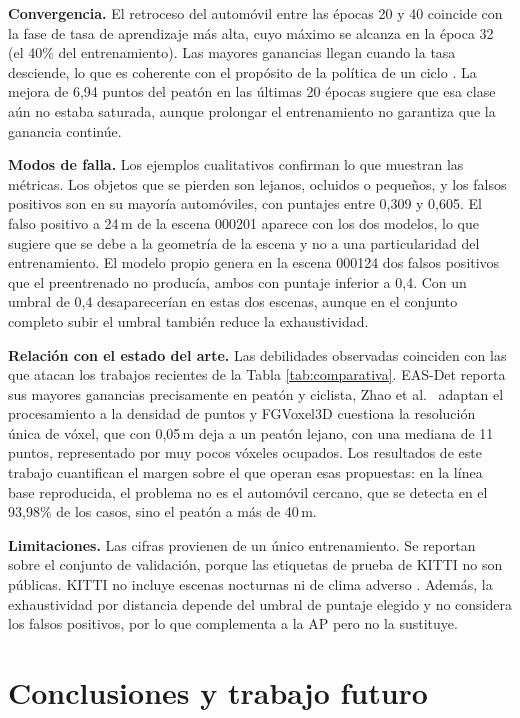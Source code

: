 \documentclass[11pt,letterpaper]{article}
\begin{document}
\textbf{Convergencia.} El retroceso del automóvil entre las épocas 20 y 40 coincide con la fase de tasa de aprendizaje más alta, cuyo máximo se alcanza en la época 32 (el 40\% del entrenamiento). Las mayores ganancias llegan cuando la tasa desciende, lo que es coherente con el propósito de la política de un ciclo \cite{smith2017}. La mejora de 6,94 puntos del peatón en las últimas 20 épocas sugiere que esa clase aún no estaba saturada, aunque prolongar el entrenamiento no garantiza que la ganancia continúe.

\textbf{Modos de falla.} Los ejemplos cualitativos confirman lo que muestran las métricas. Los objetos que se pierden son lejanos, ocluidos o pequeños, y los falsos positivos son en su mayoría automóviles, con puntajes entre 0,309 y 0,605. El falso positivo a 24\,m de la escena 000201 aparece con los dos modelos, lo que sugiere que se debe a la geometría de la escena y no a una particularidad del entrenamiento. El modelo propio genera en la escena 000124 dos falsos positivos que el preentrenado no producía, ambos con puntaje inferior a 0,4. Con un umbral de 0,4 desaparecerían en estas dos escenas, aunque en el conjunto completo subir el umbral también reduce la exhaustividad.

\textbf{Relación con el estado del arte.} Las debilidades observadas coinciden con las que atacan los trabajos recientes de la Tabla \ref{tab:comparativa}. EAS-Det \cite{wang2025eas} reporta sus mayores ganancias precisamente en peatón y ciclista, Zhao et al.\ \cite{zhao2025} adaptan el procesamiento a la densidad de puntos y FGVoxel3D \cite{ao2026} cuestiona la resolución única de vóxel, que con 0,05\,m deja a un peatón lejano, con una mediana de 11 puntos, representado por muy pocos vóxeles ocupados. Los resultados de este trabajo cuantifican el margen sobre el que operan esas propuestas: en la línea base reproducida, el problema no es el automóvil cercano, que se detecta en el 93,98\% de los casos, sino el peatón a más de 40\,m.

\textbf{Limitaciones.} Las cifras provienen de un único entrenamiento. Se reportan sobre el conjunto de validación, porque las etiquetas de prueba de KITTI no son públicas. KITTI no incluye escenas nocturnas ni de clima adverso \cite{dong2023}. Además, la exhaustividad por distancia depende del umbral de puntaje elegido y no considera los falsos positivos, por lo que complementa a la AP pero no la sustituye.

\section{Conclusiones y trabajo futuro}
\label{sec:conclusiones}
\end{document}
